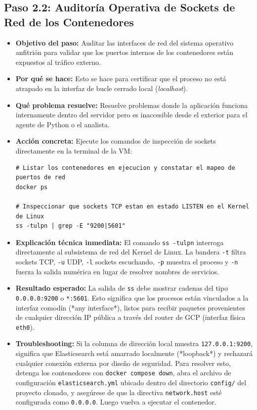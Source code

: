 \documentclass[
  coursetitle={Cómputo Nube y Tecnologías Emergentes},
  coursehours={96},
  coursedate={Verano 2026},
  doctype={Guía de Laboratorio Práctico},
  otherlangs={english,french},
  authorname={Lázaro},
  authorsurname={Bustio-Martínez},
  authortitle={PhD},
  role={Profesor Investigador},
  email={lbustio@inaoe.mx},
  phone={5559504000},
  ext={7459},
  institution={Instituto Nacional de Astrofísica, Óptica y Electrónica (INAOE)},
  department={Maestría en Ciencias en Tecnologías de Seguridad},
  address={Luis Enrique Erro 1, Sta. Ma. Tonantzintla, San Andrés Cholula, CP 72840, Puebla, México},
  margin={0.5in}
]{../../lbustio_lecture_notes}
\begin{document}
\subsection{Paso 2.2: Auditoría Operativa de Sockets de Red de los Contenedores}

\begin{itemize}
    \item \textbf{Objetivo del paso:} Auditar las interfaces de red del sistema operativo anfitrión para validar que los puertos internos de los contenedores están expuestos al tráfico externo.
    \item \textbf{Por qué se hace:} Esto se hace para certificar que el proceso no está atrapado en la interfaz de bucle cerrado local (\textit{localhost}).
    \item \textbf{Qué problema resuelve:} Resuelve problemas donde la aplicación funciona internamente dentro del servidor pero es inaccesible desde el exterior para el agente de Python o el analista.
    \item \textbf{Acción concreta:} Ejecute los comandos de inspección de sockets directamente en la terminal de la VM:
    
\begin{verbatim}
# Listar los contenedores en ejecucion y constatar el mapeo de puertos de red
docker ps

# Inspeccionar que sockets TCP estan en estado LISTEN en el Kernel de Linux
ss -tulpn | grep -E "9200|5601"
\end{verbatim}

    \item \textbf{Explicación técnica inmediata:} El comando \texttt{ss -tulpn} interroga directamente al subsistema de red del Kernel de Linux. La bandera \texttt{-t} filtra sockets TCP, \texttt{-u} UDP, \texttt{-l} sockets escuchando, \texttt{-p} muestra el proceso y \texttt{-n} fuerza la salida numérica en lugar de resolver nombres de servicios.
    
    \item \textbf{Resultado esperado:} La salida de \texttt{ss} debe mostrar cadenas del tipo \texttt{0.0.0.0:9200} o \texttt{*:5601}. Esto significa que los procesos están vinculados a la interfaz comodín (*any interface*), listos para recibir paquetes provenientes de cualquier dirección IP pública a través del router de GCP (interfaz física \texttt{eth0}).
    
    \item \textbf{Troubleshooting:} Si la columna de dirección local muestra \texttt{127.0.0.1:9200}, significa que Elasticsearch está amarrado localmente (*loopback*) y rechazará cualquier conexión externa por diseño de seguridad. Para resolver esto, detenga los contenedores con \texttt{docker compose down}, abra el archivo de configuración \texttt{elasticsearch.yml} ubicado dentro del directorio \texttt{config/} del proyecto clonado, y asegúrese de que la directiva \texttt{network.host} esté configurada como \texttt{0.0.0.0}. Luego vuelva a ejecutar el contenedor.
\end{itemize}
\end{document}
